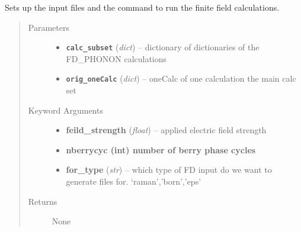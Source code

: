 \documentclass[letterpaper,10pt,english]{sphinxmanual}
\begin{document}
\begin{fulllineitems}
\label{run:run.__setup_raman}
Sets up the input files and the command to run the finite field calculations.
\begin{quote}\begin{description}
\item[{Parameters}] \leavevmode\begin{itemize}
\item {} 
\textbf{\texttt{calc\_subset}} (\emph{dict}) -- dictionary of dictionaries of the FD\_PHONON calculations

\item {} 
\textbf{\texttt{orig\_oneCalc}} (\emph{dict}) -- oneCalc of one calculation the main calc set

\end{itemize}

\item[{Keyword Arguments}] \leavevmode\begin{itemize}
\item {} 
\textbf{feild\_strength} (\emph{float}) --
applied electric field strength

\item {} 
\textbf{nberrycyc (int) number of berry phase cycles}

\item {} 
\textbf{for\_type} (\emph{str}) --
which type of FD input do we want to generate files for. `raman','born','eps'

\end{itemize}

\item[{Returns}] \leavevmode
None

\end{description}\end{quote}

\end{fulllineitems}

\end{document}
